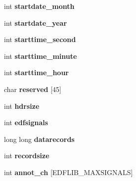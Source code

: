 \begin{DoxyCompactItemize}
\item 
\hypertarget{structedfhdrblock_ae95bd68ed93c54afa2c398e8786a162c}{}int {\bfseries startdate\+\_\+month}\label{structedfhdrblock_ae95bd68ed93c54afa2c398e8786a162c}

\item 
\hypertarget{structedfhdrblock_ab46508562a23ced4eafe267f15dff081}{}int {\bfseries startdate\+\_\+year}\label{structedfhdrblock_ab46508562a23ced4eafe267f15dff081}

\item 
\hypertarget{structedfhdrblock_ad6974cc979faf51acae3f3443900ecb1}{}int {\bfseries starttime\+\_\+second}\label{structedfhdrblock_ad6974cc979faf51acae3f3443900ecb1}

\item 
\hypertarget{structedfhdrblock_ad7a9195f5204b97b0c128978083b52a5}{}int {\bfseries starttime\+\_\+minute}\label{structedfhdrblock_ad7a9195f5204b97b0c128978083b52a5}

\item 
\hypertarget{structedfhdrblock_afa78389a59fe2c6b39d4a98af707860e}{}int {\bfseries starttime\+\_\+hour}\label{structedfhdrblock_afa78389a59fe2c6b39d4a98af707860e}

\item 
\hypertarget{structedfhdrblock_a15555e1afaa47b374b2408b9c3d3bd48}{}char {\bfseries reserved} \mbox{[}45\mbox{]}\label{structedfhdrblock_a15555e1afaa47b374b2408b9c3d3bd48}

\item 
\hypertarget{structedfhdrblock_a190e848a9d7a0dd63ec65d6af8f8c776}{}int {\bfseries hdrsize}\label{structedfhdrblock_a190e848a9d7a0dd63ec65d6af8f8c776}

\item 
\hypertarget{structedfhdrblock_ae944a22a91aa14975a1e72dedad57bea}{}int {\bfseries edfsignals}\label{structedfhdrblock_ae944a22a91aa14975a1e72dedad57bea}

\item 
\hypertarget{structedfhdrblock_a95debe0dd8e586dc2deb55ab5e41921a}{}long long {\bfseries datarecords}\label{structedfhdrblock_a95debe0dd8e586dc2deb55ab5e41921a}

\item 
\hypertarget{structedfhdrblock_ab0a2eeb055be8c3f09978061409380fc}{}int {\bfseries recordsize}\label{structedfhdrblock_ab0a2eeb055be8c3f09978061409380fc}

\item 
\hypertarget{structedfhdrblock_a6fda2491ad5b870a42528ace8766cff8}{}int {\bfseries annot\+\_\+ch} \mbox{[}E\+D\+F\+L\+I\+B\+\_\+\+M\+A\+X\+S\+I\+G\+N\+A\+L\+S\mbox{]}\label{structedfhdrblock_a6fda2491ad5b870a42528ace8766cff8}


\end{DoxyCompactItemize}
